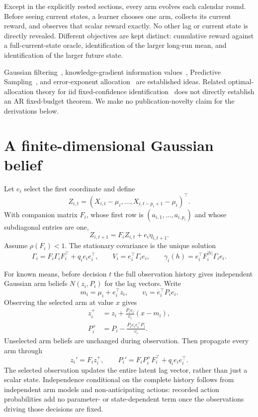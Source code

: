 \documentclass[11pt]{article}
\begin{document}
Except in the explicitly rested sections, every arm evolves each calendar round. Before seeing current states, a learner chooses one arm, collects its current reward, and observes that scalar reward exactly. No other lag or current state is directly revealed. Different objectives are kept distinct: cumulative reward against a full-current-state oracle, identification of the larger long-run mean, and identification of the larger future state.

Gaussian filtering~\cite{kalman1960}, knowledge-gradient information values~\cite{frazier2008}, Predictive Sampling~\cite{liu2023}, and error-exponent allocation~\cite{glynn2004} are established ideas. Related optimal-allocation theory for iid fixed-confidence identification~\cite{garivier2016} does not directly establish an AR fixed-budget theorem. We make no publication-novelty claim for the derivations below.

\section{A finite-dimensional Gaussian belief}
Let $e_i$ select the first coordinate and define
\[
Z_{i,t}=(X_{i,t}-\mu_i,\ldots,X_{i,t-p_i+1}-\mu_i)^\top.
\]
With companion matrix $F_i$, whose first row is $(a_{i,1},\ldots,a_{i,p_i})$ and whose subdiagonal entries are one,
\begin{equation}
Z_{i,t+1}=F_iZ_{i,t}+e_i\eta_{i,t+1}.
\end{equation}
Assume $\rho(F_i)<1$. The stationary covariance is the unique solution
\begin{equation}
\Gamma_i=F_i\Gamma_iF_i^\top+q_ie_ie_i^\top,
\qquad V_i=e_i^\top\Gamma_ie_i,
\qquad \gamma_i(h)=e_i^\top F_i^{|h|}\Gamma_ie_i.
\label{eq:stationary}
\end{equation}

For known means, before decision $t$ the full observation history gives independent Gaussian arm beliefs $N(z_i,P_i)$ for the lag vectors. Write
\begin{equation}
m_i=\mu_i+e_i^\top z_i,\qquad v_i=e_i^\top P_ie_i.
\end{equation}
Observing the selected arm at value $x$ gives
\begin{align}
z_i^+&=z_i+\frac{P_ie_i}{v_i}(x-m_i),\\
P_i^+&=P_i-\frac{P_ie_ie_i^\top P_i}{v_i}.
\label{eq:update}
\end{align}
Unselected arm beliefs are unchanged during observation. Then propagate every arm through
\begin{equation}
z_i'=F_iz_i^+,\qquad
P_i'=F_iP_i^+F_i^\top+q_ie_ie_i^\top.
\label{eq:propagate}
\end{equation}
The selected observation updates the entire latent lag vector, rather than just a scalar state. Independence conditional on the complete history follows from independent arm models and non-anticipating actions: recorded action probabilities add no parameter- or state-dependent term once the observations driving those decisions are fixed.
\end{document}

